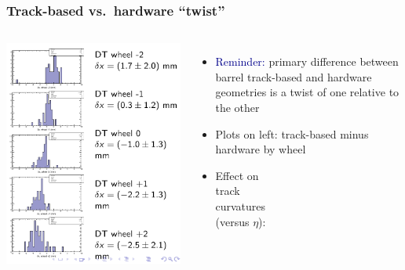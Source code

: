 \documentclass[compress]{beamer}
\begin{document}
\begin{frame}
\frametitle{Track-based vs.\ hardware ``twist''}
\begin{columns}
\includegraphics[width=\linewidth]{twist1.png}

\begin{itemize}
\item \textcolor{darkblue}{Reminder:} primary difference between
  barrel track-based and hardware geometries is a twist of one
  relative to the other

\item Plots on left: track-based minus hardware by wheel

\item Effect on \\ track \\ curvatures \\ (versus $\eta$):


\end{itemize}
\end{columns}
\end{frame}
\end{document}
